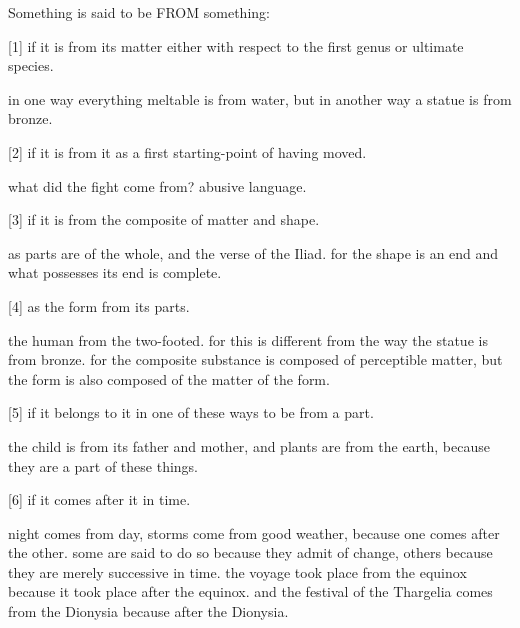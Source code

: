 Something is said to be FROM something:

[1] if it is from its matter either with respect to 
    the first genus or ultimate species.

    in one way everything meltable is from water,
    but in another way a statue is from bronze.

[2] if it is from it as a first starting-point of having moved.

    what did the fight come from? abusive language.

[3] if it is from the composite of matter and shape.

    as parts are of the whole, and the verse of the Iliad.
    for the shape is an end and what possesses its end is complete.

[4] as the form from its parts.

    the human from the two-footed. for this is different from
    the way the statue is from bronze. for the composite substance
    is composed of perceptible matter, but the form is also composed
    of the matter of the form.

[5] if it belongs to it in one of these ways to be from a part. 

    the child is from its father and mother, and
    plants are from the earth, because they are a part of these things.

[6] if it comes after it in time.

    night comes from day, storms come from good weather,
    because one comes after the other.
    some are said to do so because they admit of change,
    others because they are merely successive in time.
    the voyage took place from the equinox because 
    it took place after the equinox.
    and the festival of the Thargelia comes from the Dionysia
    because after the Dionysia.
